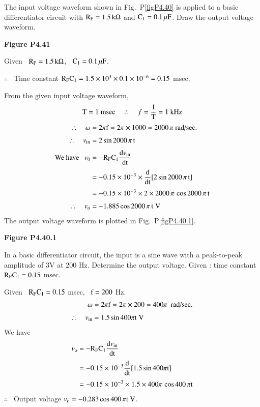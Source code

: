 \begin{problem}\label{prob4.41}
The input voltage waveform shown in Fig.~P\ref{figP4.40} is applied to a basic differentiator circuit with $\textrm{R}_{\textrm{F}}=1.5\,\textrm{k}\Omega$ and $\textrm{C}_{1}=0.1\,\mu\textrm{F}$. Draw the output voltage waveform.
\begin{center}
{\bf Figure P4.41}
\end{center}
\end{problem}

\begin{solution}
Given~ $\textrm{R}_{\textrm{F}}=1.5\,\textrm{k}\Omega$, \ $\textrm{C}_{1}=0.1\,\mu\textrm{F}$.

\medskip
$\therefore$~ Time constant $\textrm{R}_{\textrm{F}}\textrm{C}_{1}=1.5\times 10^{3}\times 0.1\times 10^{-6}=0.15$ msec.

\medskip
From the given input voltage waveform,
$$
\textrm{T}=1\text{~msec}\quad \therefore\quad f=\dfrac{1}{\textrm{T}}=1\text{~kHz}
$$
\begin{align*}
\therefore\quad \omega &= 2\pi\textrm{f} =2\pi\times 1000=2000\,\pi\text{~rad/sec.}\\[3pt]
\therefore\quad v_{\text{in}} &= 2\sin 2000\,\pi\, \textrm{t}\\[3pt]
\text{We have~~ } v_{0} &= -\textrm{R}_{\textrm{F}}\textrm{C}_{1}\dfrac{\textrm{d} v_{\text{in}}}{\operatorname{dt}}\\[3pt]
&= -0.15\times 10^{-3}\times \dfrac{\textrm{d}}{\operatorname{dt}}[2\sin 2000\,\pi\,\textrm{t}]\\[3pt]
&= -0.15\times 10^{-3}\times 2\times 2000\,\pi\,\cos 2000\,\pi\,\textrm{t}\\[3pt]
\therefore\quad v_{\textrm{o}} &= -1.885\cos 2000\,\pi\,\textrm{t}\;\textrm{V}
\end{align*}
The output voltage waveform is plotted in Fig.~P\ref{figP4.40.1}.
\begin{center}
{\bf Figure P4.40.1}
\end{center}
\end{solution}

\begin{problem}\label{prob4.42}
In a basic differentiator circuit, the input is a sine wave with a peak-to-peak amplitude of 3V at 200 Hz. Determine the output voltage. Given : time constant $\textrm{R}_{\textrm{F}}\textrm{C}_{1}=0.15$ msec.
\end{problem}

\begin{solution}
Given \ $\textrm{R}_{\textrm{F}}\textrm{C}_{1}=0.15$ msec, \ $\textrm{f}=200$ Hz.
\begin{align*}
\omega &= 2\pi \textrm{f} = 2\pi \times 200=400 \pi\text{~ rad/sec.}\\[3pt]
\therefore\quad v_{\text{in}} &= 1.5\sin 400 \pi \textrm{t}\;\textrm{V}
\end{align*}
We have
\begin{align*}
v_{\textrm{o}} &= -\textrm{R}_{\textrm{F}}\textrm{C}_{1}\dfrac{\textrm{d} v_{\text{in}}}{\operatorname{dt}}\\[3pt]
&= -0.15\times 10^{-3}\dfrac{\textrm{d}}{\operatorname{dt}}[1.5\sin 400 \pi \textrm{t}]\\[3pt]
&= -0.15\times 10^{-3}\times 1.5\times 400\pi\,\cos 400 \,\pi \textrm{t}
\end{align*}
$\therefore$~ Output voltage $v_{\textrm{o}}=-0.283\cos 400\,\pi\textrm{t} \ \textrm{V}$.
\end{solution}

